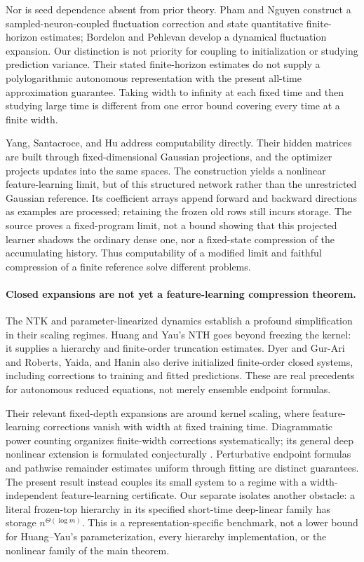 \documentclass[11pt]{article}
\theoremstyle{definition}
\theoremstyle{remark}
\begin{document}
Nor is seed dependence absent from prior theory. Pham and Nguyen
\cite{pham2021fluctuations} construct a sampled-neuron-coupled fluctuation
correction and state quantitative finite-horizon estimates; Bordelon and
Pehlevan \cite{bordelon2023finite} develop a dynamical fluctuation expansion.
Our distinction is not priority for coupling to initialization or studying
prediction variance. Their stated finite-horizon estimates do not supply
a polylogarithmic autonomous representation
with the present all-time approximation guarantee. Taking width to infinity
at each fixed time and then studying large time is different from one error
bound covering every time at a finite width.

Yang, Santacroce, and Hu \cite{yang2022efficient} address computability
directly. Their hidden matrices are built through fixed-dimensional Gaussian
projections, and the optimizer projects updates into the same spaces.
The construction yields a nonlinear feature-learning limit, but of this
structured network rather than the unrestricted Gaussian reference.
Its coefficient arrays append forward and backward directions as examples
are processed; retaining the frozen old rows still incurs storage.
The source proves a fixed-program limit, not a bound showing that this
projected learner shadows the ordinary dense one, nor a fixed-state
compression of the accumulating history. Thus computability of a modified
limit and faithful compression of a finite reference solve different problems.

\paragraph{Closed expansions are not yet a feature-learning compression theorem.}
The NTK \cite{jacot2018ntk} and parameter-linearized dynamics
\cite{lee2019wide} establish a profound simplification in their scaling
regimes. Huang and Yau's NTH \cite{huang2020nth} goes beyond freezing the
kernel: it supplies a hierarchy and finite-order truncation estimates.
Dyer and Gur-Ari \cite{dyer2020asymptotics} and Roberts, Yaida, and Hanin
\cite{roberts2021principles} also derive initialized finite-order closed
systems, including corrections to training and fitted predictions.
These are real precedents for autonomous reduced equations, not merely
ensemble endpoint formulas.

Their relevant fixed-depth expansions are around kernel scaling, where
feature-learning corrections vanish with width at fixed training time.
Diagrammatic power counting organizes finite-width corrections systematically;
its general deep nonlinear extension is formulated conjecturally
\cite{dyer2020asymptotics}. Perturbative endpoint formulas and pathwise
remainder estimates uniform through fitting are distinct guarantees.
The present result instead couples its small system to a
regime with a width-independent feature-learning certificate.
Our separate  isolates another obstacle: a literal
frozen-top hierarchy in its specified short-time deep-linear family has
storage $n^{\Theta(\log m)}$. This is a representation-specific benchmark,
not a lower bound for Huang--Yau's parameterization, every hierarchy
implementation, or the nonlinear family of the main theorem.
\end{document}
